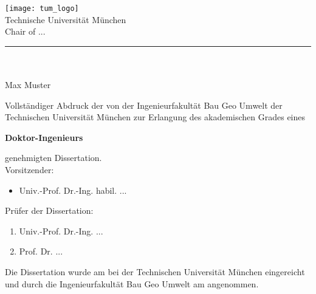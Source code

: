 \begin{titlingpage}
\cleardoublepage
\begin{center}
\texttt{[image: tum\_logo]}\\[0.5cm]
{ \LARGE  Technische Universität München}\\[0.3cm]
{ \LARGE  Chair of ...}\\[0.4cm]	
\rule{1\textwidth}{0.5mm} \\[0.4cm] 
\textsc{\scshape \Large \PhDtitle }\\[0.4cm]
Max Muster \\[1.4cm]
\begin{flushleft}
Vollständiger Abdruck der von der Ingenieurfakultät Bau Geo Umwelt
der Technischen Universität München zur Erlangung des akademischen Grades eines
\end{flushleft}    
{ \textbf{Doktor-Ingenieurs}}\\
\begin{flushleft}	
{genehmigten Dissertation.}\\[1cm]


Vorsitzender:\\
\frenchspacing 
\begin{itemize}[labelindent=\parindent,itemsep=1pt]
\item[] Univ.-Prof. Dr.-Ing. habil. ...
\end{itemize}
\nonfrenchspacing  
Prüfer der Dissertation:\\
\frenchspacing 
\begin{enumerate}[labelindent=\parindent,itemsep=1pt]
\setlength{\parskip}{0pt}
\item Univ.-Prof. Dr.-Ing. ...
\item Prof. Dr. ... 
\end{enumerate}
\nonfrenchspacing  
Die Dissertation wurde am  bei der Technischen Universität München eingereicht und durch die Ingenieurfakultät Bau Geo Umwelt am   angenommen.
\end{flushleft}		
\end{center}
\end{titlingpage}
